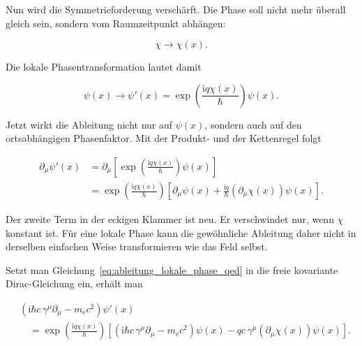 Nun wird die Symmetrieforderung verschärft. Die Phase soll nicht mehr
überall gleich sein, sondern vom Raumzeitpunkt abhängen:

\begin{equation}
	\chi
	\longrightarrow
	\chi(x).
	\label{eq:phase_wird_lokal_qed}
\end{equation}

Die lokale Phasentransformation
lautet damit

\begin{equation}
	\psi(x)
	\longrightarrow
	\psi'(x)
	=
	\exp\left(
	\frac{\mathrm{i}q\chi(x)}{\hbar}
	\right)
	\psi(x).
	\label{eq:lokale_phasentransformation_qed}
\end{equation}

Jetzt wirkt die Ableitung nicht nur auf \(\psi(x)\), sondern auch auf
den ortsabhängigen Phasenfaktor. Mit der Produkt- und der Kettenregel
folgt

\begin{equation}
	\begin{aligned}
		\partial_\mu\psi'(x)
		&=
		\partial_\mu
		\left[
		\exp\left(
		\frac{\mathrm{i}q\chi(x)}{\hbar}
		\right)
		\psi(x)
		\right]
		\\[4pt]
		&=
		\exp\left(
		\frac{\mathrm{i}q\chi(x)}{\hbar}
		\right)
		\left[
		\partial_\mu\psi(x)
		+
		\frac{\mathrm{i}q}{\hbar}
		\left(\partial_\mu\chi(x)\right)
		\psi(x)
		\right].
	\end{aligned}
	\label{eq:ableitung_lokale_phase_qed}
\end{equation}

Der zweite Term in der eckigen Klammer ist neu. Er verschwindet nur,
wenn \(\chi\) konstant ist. Für eine lokale Phase kann die gewöhnliche
Ableitung daher nicht in derselben einfachen Weise transformieren wie
das Feld selbst.

Setzt man Gleichung~\eqref{eq:ableitung_lokale_phase_qed} in die freie
kovariante Dirac-Gleichung ein, erhält man

\begin{equation}
	\begin{aligned}
	&\left(
	\mathrm{i}\hbar c\,\gamma^\mu\partial_\mu
	-
	m_{\mathrm e}c^2
	\right)
	\psi'(x)
	\\[4pt]
	&\quad=
	\exp\left(
	\frac{\mathrm{i}q\chi(x)}{\hbar}
	\right)
	\left[
	\left(
	\mathrm{i}\hbar c\,\gamma^\mu\partial_\mu
	-
	m_{\mathrm e}c^2
	\right)
	\psi(x)
	-
	qc\,\gamma^\mu
	\left(\partial_\mu\chi(x)\right)
	\psi(x)
	\right].
	\end{aligned}
	\label{eq:freie_diracgleichung_lokal_transformiert_qed}
\end{equation}


